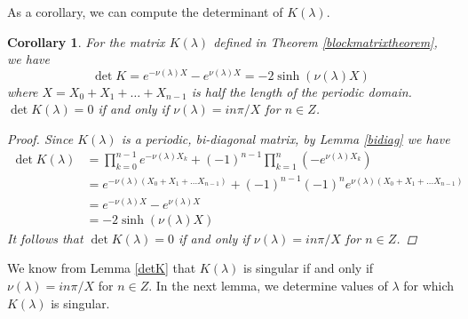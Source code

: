 \documentclass[12pt]{article}
\newtheorem{corollary}{Corollary}
\begin{document}
As a corollary, we can compute the determinant of $K(\lambda)$.


\begin{corollary}\label{detKcorr}
For the matrix $K(\lambda)$ defined in Theorem \ref{blockmatrixtheorem}, we have 
\begin{equation}\label{detK}
\det K = e^{-\nu(\lambda)X} - e^{\nu(\lambda)X} = -2 \sinh (\nu(\lambda) X)
\end{equation}
where $X = X_0 + X_1 + \dots + X_{n-1}$ is half the length of the periodic domain. $\det K(\lambda) = 0$ if and only if $\nu(\lambda) = i n \pi/X$ for $n \in Z$. 
\begin{proof}
Since $K(\lambda)$ is a periodic, bi-diagonal matrix, by Lemma \ref{bidiag} we have
\begin{align*}
\det K(\lambda) &= \prod_{k = 0}^{n-1} e^{-\nu(\lambda)X_k} + (-1)^{n-1} \prod_{k = 1}^n (-e^{\nu(\lambda)X_k}) \\
&= e^{-\nu(\lambda)(X_0 + X_1 + \dots X_{n-1})} + (-1)^{n-1} (-1)^n e^{\nu(\lambda)(X_0 + X_1 + \dots X_{n-1})} \\
&= e^{-\nu(\lambda)X} - e^{\nu(\lambda)X} \\
&= -2 \sinh (\nu(\lambda)X)
\end{align*}
It follows that $\det K(\lambda) = 0$ if and only if $\nu(\lambda) = i n \pi/X$ for $n \in Z$.
\end{proof}
\end{corollary}

We know from Lemma \ref{detK} that $K(\lambda)$ is singular if and only if $\nu(\lambda) = i n \pi/X$ for $n \in Z$. In the next lemma, we determine values of $\lambda$ for which $K(\lambda)$ is singular. 

\end{document}
